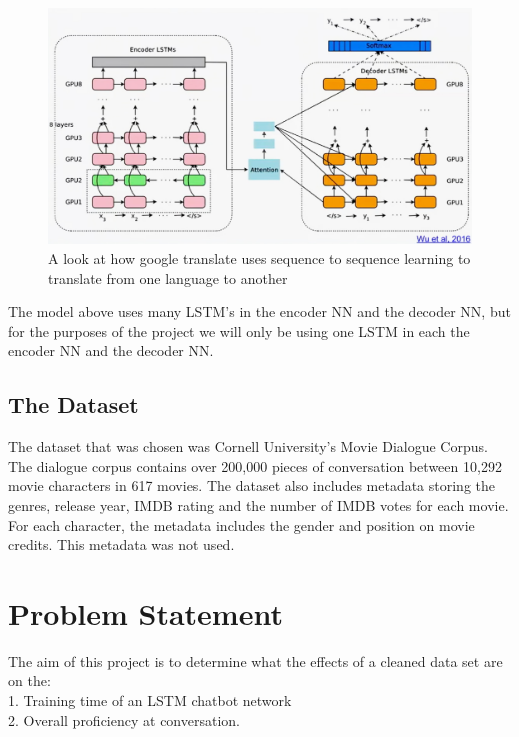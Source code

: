 \documentclass[titlepage]{article}
\newcommand\tab[1][1cm]{\hspace*{#1}}
\begin{document}
\begin{figure}[H]
	\centering
	\includegraphics[width=120mm]{Seq2seq.jpg}
	\caption{A look at how google translate uses sequence to sequence learning to translate from one language to another}
	\label{fig:seq2seqgoogletranslate}
\end{figure}
The model above uses many LSTM's in the encoder NN and the decoder NN, but for the purposes of the project we will only be using one LSTM in each the encoder NN and the decoder NN.\\

\subsection*{The Dataset}
The dataset that was chosen was Cornell University's Movie Dialogue Corpus.\cite{chameleons, cornell} The dialogue corpus contains over 200,000 pieces of conversation between 10,292 movie characters in 617 movies. The dataset also includes metadata storing the genres, release year, IMDB rating and the number of IMDB votes for each movie. For each character, the metadata includes the gender and position on movie credits. This metadata was not used.

\section{Problem Statement}
The aim of this project is to determine what the effects of a cleaned data set are on the:\\
\tab 1. Training time of an LSTM chatbot network\\
\tab 2. Overall proficiency at conversation.
\end{document}

